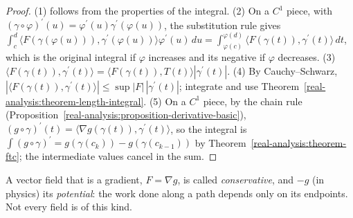 \begin{proof}
(1) follows from the properties of the integral. (2) On a $C^1$ piece, with $(\gamma \circ \varphi)^{\prime}(u) = \varphi^{\prime}(u)\gamma^{\prime}(\varphi(u))$, the substitution rule gives
$\int_c^d\langle F(\gamma(\varphi(u))), \gamma^{\prime}(\varphi(u))\rangle\varphi^{\prime}(u)\,du = \int_{\varphi(c)}^{\varphi(d)}\langle F(\gamma(t)), \gamma^{\prime}(t)\rangle\,dt$, which is the original integral if $\varphi$
increases and its negative if $\varphi$ decreases. (3) $\langle F(\gamma(t)), \gamma^{\prime}(t)\rangle = \langle F(\gamma(t)), T(t)\rangle|\gamma^{\prime}(t)|$. (4) By Cauchy--Schwarz,
$|\langle F(\gamma(t)), \gamma^{\prime}(t)\rangle| \leq \sup|F|\,|\gamma^{\prime}(t)|$; integrate and use Theorem~\ref{real-analysis:theorem-length-integral}. (5) On a $C^1$ piece, by the chain rule
(Proposition~\ref{real-analysis:proposition-derivative-basic}), $(g \circ \gamma)^{\prime}(t) = \langle\nabla g(\gamma(t)), \gamma^{\prime}(t)\rangle$, so the integral is $\int(g \circ \gamma)^{\prime} = g(\gamma(c_k)) - g(\gamma(c_{k-1}))$ by
Theorem~\ref{real-analysis:theorem-ftc}; the intermediate values cancel in the sum.
\end{proof}

A vector field that is a gradient, $F = \nabla g$, is called \emph{conservative}, and $-g$ (in physics) its \emph{potential}: the work done along a path depends only on its endpoints. Not every field
is of this kind.


